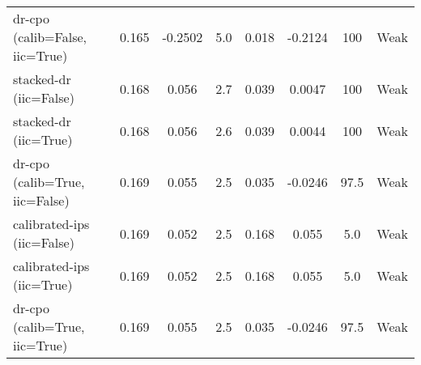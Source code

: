 \begin{table}[htbp]
\begin{tabular}{l|ccccccc}
dr-cpo (calib=False, iic=True) & 0.165 & -0.2502 & 5.0 & 0.018 & -0.2124 & 100 & Weak \\
stacked-dr (iic=False) & 0.168 & 0.056 & 2.7 & 0.039 & 0.0047 & 100 & Weak \\
stacked-dr (iic=True) & 0.168 & 0.056 & 2.6 & 0.039 & 0.0044 & 100 & Weak \\
dr-cpo (calib=True, iic=False) & 0.169 & 0.055 & 2.5 & 0.035 & -0.0246 & 97.5 & Weak \\
calibrated-ips (iic=False) & 0.169 & 0.052 & 2.5 & 0.168 & 0.055 & 5.0 & Weak \\
calibrated-ips (iic=True) & 0.169 & 0.052 & 2.5 & 0.168 & 0.055 & 5.0 & Weak \\
dr-cpo (calib=True, iic=True) & 0.169 & 0.055 & 2.5 & 0.035 & -0.0246 & 97.5 & Weak \\
\bottomrule
\end{tabular}
\end{table}